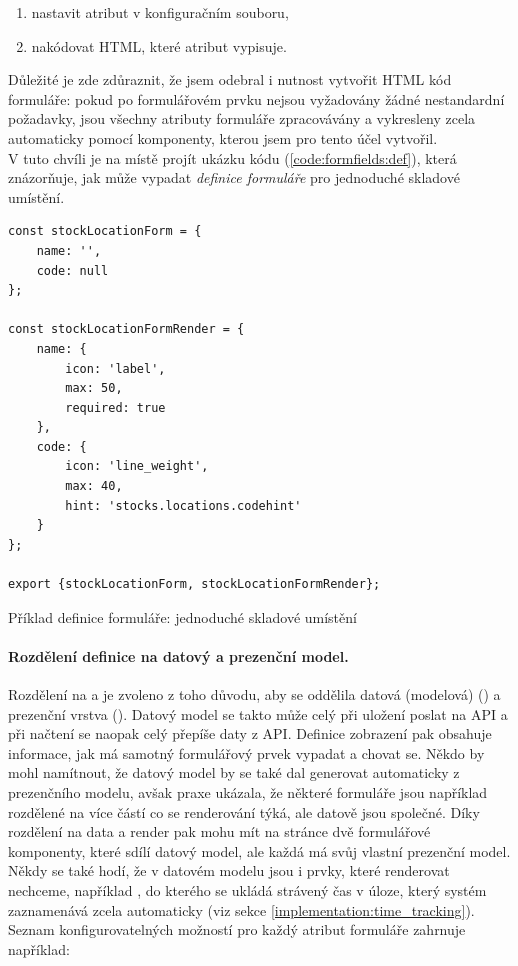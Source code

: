 \begin{enumerate}
    \item nastavit atribut v konfiguračním souboru,
    \item nakódovat HTML, které atribut vypisuje.
\end{enumerate}

Důležité je zde zdůraznit, že jsem odebral i nutnost vytvořit HTML kód formuláře: pokud po formulářovém prvku nejsou vyžadovány žádné nestandardní požadavky, jsou všechny atributy formuláře zpracovávány a vykresleny zcela automaticky pomocí komponenty, kterou jsem pro tento účel vytvořil.\\
V tuto chvíli je na místě projít ukázku kódu (\ref{code:formfields:def}), která znázorňuje, jak může vypadat \emph{definice formuláře} pro jednoduché skladové umístění.

\begin{listing}[h]
\begin{verbatim}
const stockLocationForm = {
    name: '',
    code: null
};

const stockLocationFormRender = {
    name: {
        icon: 'label',
        max: 50,
        required: true
    },
    code: {
        icon: 'line_weight',
        max: 40,
        hint: 'stocks.locations.codehint'
    }
};

export {stockLocationForm, stockLocationFormRender};
\end{verbatim}
\caption{Příklad definice formuláře: jednoduché skladové umístění} \label{code:formfields:def}
\end{listing}

\paragraph{Rozdělení definice na datový a prezenční model.} Rozdělení na  a  je zvoleno z toho důvodu, aby se oddělila datová (modelová) () a prezenční vrstva (). Datový model se takto může celý při uložení poslat na API a při načtení se naopak celý přepíše daty z API. Definice zobrazení pak obsahuje informace, jak má samotný formulářový prvek vypadat a chovat se. Někdo by mohl namítnout, že datový model by se také dal generovat automaticky z prezenčního modelu, avšak praxe ukázala, že některé formuláře jsou například rozdělené na více částí co se renderování týká, ale datově jsou společné. Díky rozdělení na data a render pak mohu mít na stránce dvě formulářové komponenty, které sdílí datový model, ale každá má svůj vlastní prezenční model. Někdy se také hodí, že v datovém modelu jsou i prvky, které renderovat nechceme, například , do kterého se ukládá strávený čas v úloze, který systém zaznamenává zcela automaticky (viz sekce \ref{implementation:time_tracking}). \\
Seznam konfigurovatelných možností pro každý atribut formuláře zahrnuje například:

